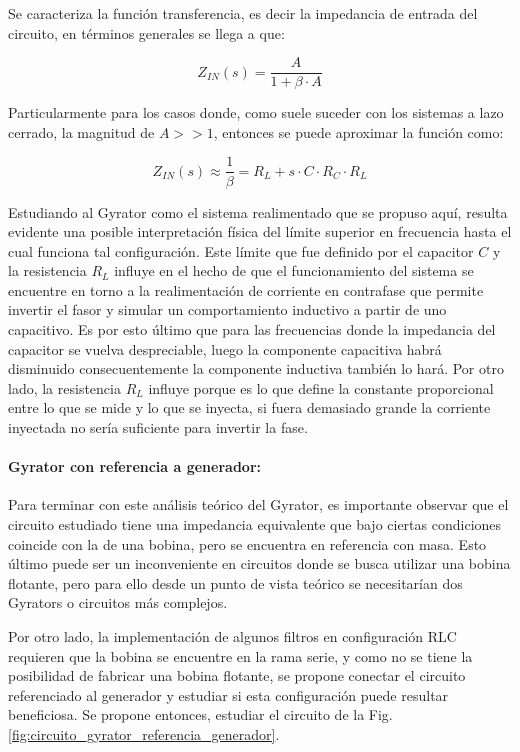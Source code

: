 Se caracteriza la funci\'on transferencia, es decir la impedancia de entrada del circuito, en t\'erminos generales se llega a que:

\begin{equation}
    Z_{IN}(s) = \frac{A}{1 + \beta \cdot A}
\end{equation}

Particularmente para los casos donde, como suele suceder con los sistemas a lazo cerrado, la magnitud de $A >> 1$, entonces se puede aproximar
la funci\'on como:

\begin{equation}
    Z_{IN}(s) \approx \frac{1}{\beta} = R_L + s \cdot C \cdot R_C \cdot R_L
\end{equation}

Estudiando al Gyrator como el sistema realimentado que se propuso aqu\'i, resulta evidente una posible interpretaci\'on f\'isica del l\'imite superior en frecuencia
hasta el cual funciona tal configuraci\'on. Este l\'imite que fue definido por el capacitor $C$ y la resistencia $R_L$ influye en el hecho de que el funcionamiento del sistema se encuentre en torno
a la realimentaci\'on de corriente en contrafase que permite invertir el fasor y simular un comportamiento inductivo a partir de uno capacitivo. Es por esto \'ultimo que para las frecuencias donde la impedancia del capacitor se vuelva despreciable, luego 
 la componente capacitiva habr\'a disminuido consecuentemente la componente inductiva tambi\'en lo har\'a.
Por otro lado, la resistencia $R_L$ influye porque es lo que define la constante proporcional entre lo que se mide y lo que se inyecta, si fuera demasiado grande  la corriente inyectada no ser\'ia suficiente para invertir la fase.

\paragraph*{Gyrator con referencia a generador:} Para terminar con este an\'alisis te\'orico del Gyrator, es importante observar que el circuito estudiado tiene una impedancia equivalente
que bajo ciertas condiciones coincide con la de una bobina, pero se encuentra en referencia con masa. Esto \'ultimo puede ser un inconveniente en circuitos donde se busca utilizar una bobina flotante,
pero para ello desde un punto de vista te\'orico se necesitar\'ian dos Gyrators o circuitos m\'as complejos.

Por otro lado, la implementaci\'on de algunos filtros en configuraci\'on RLC requieren que la bobina se encuentre en la rama serie, y como no se tiene la posibilidad de fabricar una bobina flotante,
se propone conectar el circuito referenciado al generador y estudiar si esta configuraci\'on puede resultar beneficiosa. Se propone entonces, estudiar el circuito de la Fig. \ref{fig:circuito_gyrator_referencia_generador}.

